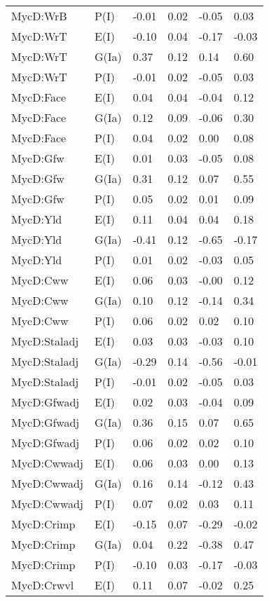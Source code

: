 \begin{center}
\begin{longtable}{|p{1.1in}|p{0.7in}|p{0.7in}|p{0.6in}|p{0.6in}|p{0.6in}|}
  MycD:WrB & P(I) & -0.01 & 0.02 & -0.05 & 0.03 \\ 
  MycD:WrT & E(I) & -0.10 & 0.04 & -0.17 & -0.03 \\ 
  MycD:WrT & G(Ia) & 0.37 & 0.12 & 0.14 & 0.60 \\ 
  MycD:WrT & P(I) & -0.01 & 0.02 & -0.05 & 0.03 \\ 
  MycD:Face & E(I) & 0.04 & 0.04 & -0.04 & 0.12 \\ 
  MycD:Face & G(Ia) & 0.12 & 0.09 & -0.06 & 0.30 \\ 
  MycD:Face & P(I) & 0.04 & 0.02 & 0.00 & 0.08 \\ 
  MycD:Gfw & E(I) & 0.01 & 0.03 & -0.05 & 0.08 \\ 
  MycD:Gfw & G(Ia) & 0.31 & 0.12 & 0.07 & 0.55 \\ 
  MycD:Gfw & P(I) & 0.05 & 0.02 & 0.01 & 0.09 \\ 
  MycD:Yld & E(I) & 0.11 & 0.04 & 0.04 & 0.18 \\ 
  MycD:Yld & G(Ia) & -0.41 & 0.12 & -0.65 & -0.17 \\ 
  MycD:Yld & P(I) & 0.01 & 0.02 & -0.03 & 0.05 \\ 
  MycD:Cww & E(I) & 0.06 & 0.03 & -0.00 & 0.12 \\ 
  MycD:Cww & G(Ia) & 0.10 & 0.12 & -0.14 & 0.34 \\ 
  MycD:Cww & P(I) & 0.06 & 0.02 & 0.02 & 0.10 \\ 
  MycD:Staladj & E(I) & 0.03 & 0.03 & -0.03 & 0.10 \\ 
  MycD:Staladj & G(Ia) & -0.29 & 0.14 & -0.56 & -0.01 \\ 
  MycD:Staladj & P(I) & -0.01 & 0.02 & -0.05 & 0.03 \\ 
  MycD:Gfwadj & E(I) & 0.02 & 0.03 & -0.04 & 0.09 \\ 
  MycD:Gfwadj & G(Ia) & 0.36 & 0.15 & 0.07 & 0.65 \\ 
  MycD:Gfwadj & P(I) & 0.06 & 0.02 & 0.02 & 0.10 \\ 
  MycD:Cwwadj & E(I) & 0.06 & 0.03 & 0.00 & 0.13 \\ 
  MycD:Cwwadj & G(Ia) & 0.16 & 0.14 & -0.12 & 0.43 \\ 
  MycD:Cwwadj & P(I) & 0.07 & 0.02 & 0.03 & 0.11 \\ 
  MycD:Crimp & E(I) & -0.15 & 0.07 & -0.29 & -0.02 \\ 
  MycD:Crimp & G(Ia) & 0.04 & 0.22 & -0.38 & 0.47 \\ 
  MycD:Crimp & P(I) & -0.10 & 0.03 & -0.17 & -0.03 \\ 
  MycD:Crwvl & E(I) & 0.11 & 0.07 & -0.02 & 0.25 \\ 

\end{longtable}
\end{center}
